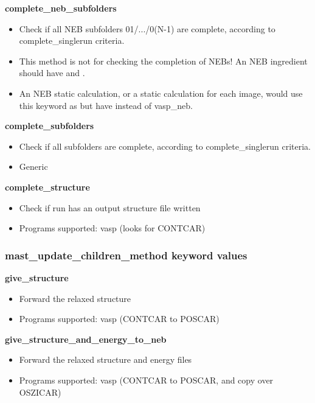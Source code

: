\documentclass[letterpaper,10pt,english]{sphinxmanual}
\begin{document}
\textbf{complete\_neb\_subfolders}
\begin{itemize}
\item {} 
Check if all NEB subfolders 01/.../0(N-1) are complete, according to complete\_singlerun criteria.

\item {} 
This method is not for checking the completion of NEBs! An NEB ingredient should have  and .

\item {} 
An NEB static calculation, or a static calculation for each image, would use this keyword as  but have  instead of vasp\_neb.

\end{itemize}

\textbf{complete\_subfolders}
\begin{itemize}
\item {} 
Check if all subfolders are complete, according to complete\_singlerun criteria.

\item {} 
Generic

\end{itemize}

\textbf{complete\_structure}
\begin{itemize}
\item {} 
Check if run has an output structure file written

\item {} 
Programs supported: vasp (looks for CONTCAR)

\end{itemize}


\subsubsection{mast\_update\_children\_method keyword values}
\label{3_0_inputfile:mast-update-children-method-keyword-values}
\textbf{give\_structure}
\begin{itemize}
\item {} 
Forward the relaxed structure

\item {} 
Programs supported: vasp (CONTCAR to POSCAR)

\end{itemize}

\textbf{give\_structure\_and\_energy\_to\_neb}
\begin{itemize}
\item {} 
Forward the relaxed structure and energy files

\item {} 
Programs supported: vasp (CONTCAR to POSCAR, and copy over OSZICAR)

\end{itemize}
\end{document}
